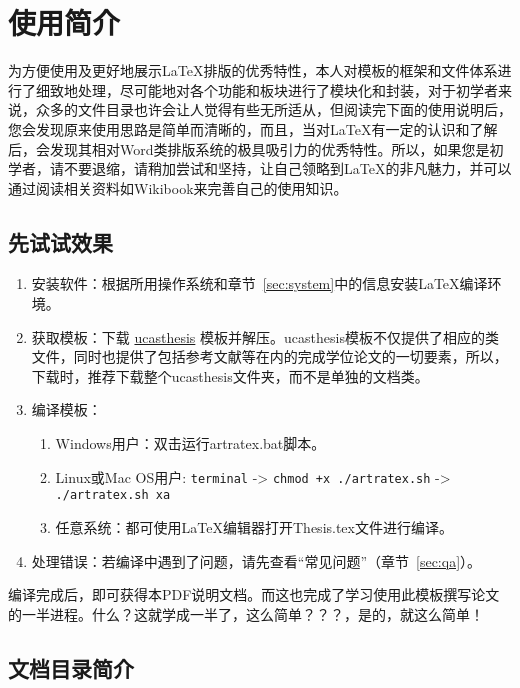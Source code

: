 
\chapter{使用简介}
\label{chap:guide}

为方便使用及更好地展示\LaTeX{}排版的优秀特性，本人对模板的框架和文件体系进行了细致地处理，尽可能地对各个功能和板块进行了模块化和封装，对于初学者来说，众多的文件目录也许会让人觉得有些无所适从，但阅读完下面的使用说明后，您会发现原来使用思路是简单而清晰的，而且，当对\LaTeX{}有一定的认识和了解后，会发现其相对Word类排版系统的极具吸引力的优秀特性。所以，如果您是初学者，请不要退缩，请稍加尝试和坚持，让自己领略到\LaTeX{}的非凡魅力，并可以通过阅读相关资料如Wikibook\citep{wikibook2014latex}来完善自己的使用知识。

\section{先试试效果}

\begin{enumerate}
    \item 安装软件：根据所用操作系统和章节~\ref{sec:system}中的信息安装\LaTeX{}编译环境。
    \item 获取模板：下载 \href{https://github.com/mohuangrui/ucasthesis}{ucasthesis} 模板并解压。ucasthesis模板不仅提供了相应的类文件，同时也提供了包括参考文献等在内的完成学位论文的一切要素，所以，下载时，推荐下载整个ucasthesis文件夹，而不是单独的文档类。
    \item 编译模板：
        \begin{enumerate}
            \item Windows用户：双击运行artratex.bat脚本。
            \item Linux或Mac OS用户: \verb|terminal| -> \verb|chmod +x ./artratex.sh| -> \verb|./artratex.sh xa|
            \item 任意系统：都可使用\LaTeX{}编辑器打开Thesis.tex文件进行编译。
        \end{enumerate}
    \item 处理错误：若编译中遇到了问题，请先查看“常见问题”（章节~\ref{sec:qa}）。
\end{enumerate}

编译完成后，即可获得本PDF说明文档。而这也完成了学习使用此模板撰写论文的一半进程。什么？这就学成一半了，这么简单？？？，是的，就这么简单！

\section{文档目录简介}


